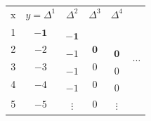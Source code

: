\documentclass{article}
\begin{document}
\begin{enumerate}
            \begin{table}[!h]
                \centering
                \begin{tabular}{c|c|c|c|c|l}
                    x &
                    $y=\Delta^1$ &
                    $\Delta^2$ &
                    $\Delta^3$ &
                    $\Delta^4$ &
                    \multirow{18}{*}{$\cdots$} \\ \cline{1-5}
                    \multirow{2}{*}{1} &
                    \multirow{2}{*}{$\mathbf{-1}$} &
                    &
                    &
                    &
                    \\
                    &
                    &
                    \multirow{2}{*}{$\mathbf{-1}$} &
                    &
                    &
                    \\
                    \multirow{2}{*}{2} &
                    \multirow{2}{*}{$-2$} &
                    &
                    \multirow{2}{*}{$\mathbf{0}$} &
                    &
                    \\
                    &
                    &
                    \multirow{2}{*}{$-1$} &
                    &
                    \multirow{2}{*}{$\mathbf{0}$} &
                    \\
                    \multirow{2}{*}{3} &
                    \multirow{2}{*}{$-3$} &
                    &
                    \multirow{2}{*}{0} &
                    &
                    \\
                    &
                    &
                    \multirow{2}{*}{$-1$} &
                    &
                    \multirow{2}{*}{0} &
                    \\
                    \multirow{2}{*}{4} &
                    \multirow{2}{*}{$-4$} &
                    &
                    \multirow{2}{*}{0} &
                    &
                    \\
                    &
                    &
                    \multirow{2}{*}{$-1$} &
                    &
                    \multirow{2}{*}{0} &
                    \\
                    \multirow{2}{*}{5} &
                    \multirow{2}{*}{$-5$} &
                    &
                    \multirow{2}{*}{0} &
                    &
                    \\
                    &
                    &
                    \multirow{3}{*}{$\vdots$} &
                    &
                    \multirow{3}{*}{$\vdots$} &

\end{tabular}
\end{table}
\end{enumerate}
\end{document}
